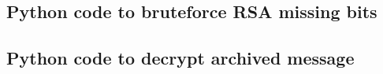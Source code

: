\documentclass[a4paper]{article}
\begin{document}
\subsection{Python code to bruteforce RSA missing bits}

\newpage



\subsection{Python code to decrypt archived message}

\end{document}
